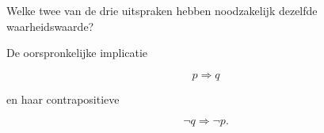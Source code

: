 \documentclass{ximera}
\begin{document}
\begin{oefening}{\oefU\ESS}
\begin{question}
\end{question}


\begin{question}

Welke twee van de drie uitspraken hebben noodzakelijk dezelfde
waarheidswaarde?

\begin{oplossing}

De oorspronkelijke implicatie

\[
p\Rightarrow q
\]

en haar contrapositieve

\[
\neg q\Rightarrow\neg p.
\]

\end{oplossing}

\end{question}

\end{oefening}


\end{document}
